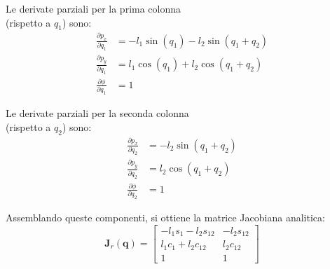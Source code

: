 ﻿\documentclass[11pt, a4paper]{article}
\begin{document}
\noindent
\begin{minipage}{0.48\textwidth}
    Le derivate parziali per la prima colonna\\
    (rispetto a \(q_1\)) sono:
    \begin{align*}
        \frac{\partial p_x}{\partial q_1} &= -l_1 \sin(q_1) - l_2 \sin(q_1+q_2) \\
        \frac{\partial p_y}{\partial q_1} &= l_1 \cos(q_1) + l_2 \cos(q_1+q_2) \\
        \frac{\partial \phi}{\partial q_1} &= 1
    \end{align*}
\end{minipage}
\hfill
\begin{minipage}{0.48\textwidth}
    Le derivate parziali per la seconda colonna\\
    (rispetto a \(q_2\)) sono:
    \begin{align*}
        \frac{\partial p_x}{\partial q_2} &= -l_2 \sin(q_1+q_2) \\
        \frac{\partial p_y}{\partial q_2} &= l_2 \cos(q_1+q_2) \\
        \frac{\partial \phi}{\partial q_2} &= 1
    \end{align*}
\end{minipage}

Assemblando queste componenti, si ottiene la matrice Jacobiana analitica:
\[
    \bm{J}_r(\bm{q}) =
    \begin{bmatrix}
        -l_1 s_1 - l_2 s_{12} & -l_2 s_{12} \\
        l_1 c_1 + l_2 c_{12} & l_2 c_{12} \\
        1 & 1
    \end{bmatrix}
\]
\newpage
\end{document}
